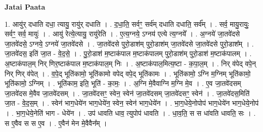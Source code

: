\documentclass[17pt]{extarticle}
\begin{document}
\textbf{Jatai Paata} \newline

1. आयु॑र् दधाति दधा॒ त्यायु॒ रायु॑र् दधाति । . द॒धा॒ति॒ सर्वꣳ॒॒ सर्व॑म् दधाति दधाति॒ सर्व᳚म् । . सर्व॒ मायु॒रायुः॒ सर्वꣳ॒॒ सर्व॒ मायुः॑ । . आयु॑ रेत्ये॒त्यायु॒ रायु॑रेति । . ए॒त्य॒ग्नये॒ ऽग्नय॑ एत्ये त्य॒ग्नये᳚ । . अ॒ग्नये॑ जा॒तवे॑दसे जा॒तवे॑दसे॒ ऽग्नये॒ ऽग्नये॑ जा॒तवे॑दसे । . जा॒तवे॑दसे पुरो॒डाश॑म् पुरो॒डाश॑म् जा॒तवे॑दसे जा॒तवे॑दसे पुरो॒डाश᳚म् । . जा॒तवे॑दस॒ इति॑ जा॒त - वे॒द॒से॒ । . पु॒रो॒डाश॑ म॒ष्टाक॑पाल म॒ष्टाक॑पालम् पुरो॒डाश॑म् पुरो॒डाश॑ म॒ष्टाक॑पालम् । . अ॒ष्टाक॑पाल॒म् निर् णिर॒ष्टाक॑पाल म॒ष्टाक॑पाल॒म् निः । . अ॒ष्टाक॑पाल॒मित्य॒ष्टा - क॒पा॒ल॒म् । . निर् व॑पेद् वपे॒न् निर् णिर् व॑पेत् । . व॒पे॒द् भूति॑कामो॒ भूति॑कामो वपेद् वपे॒द् भूति॑कामः । . भूति॑कामो॒ ऽग्नि म॒ग्निम् भूति॑कामो॒ भूति॑कामो॒ ऽग्निम् । . भूति॑काम॒ इति॒ भूति॑ - का॒मः॒ । . अ॒ग्नि मे॒वैवाग्नि म॒ग्नि मे॒व । . ए॒व जा॒तवे॑दसम् जा॒तवे॑दस मे॒वैव जा॒तवे॑दसम् । . जा॒तवे॑दसꣳ॒॒ स्वेन॒ स्वेन॑ जा॒तवे॑दसम् जा॒तवे॑दसꣳ॒॒ स्वेन॑ । . जा॒तवे॑दस॒मिति॑ जा॒त - वे॒द॒स॒म् । . स्वेन॑ भाग॒धेये॑न भाग॒धेये॑न॒ स्वेन॒ स्वेन॑ भाग॒धेये॑न । . भा॒ग॒धेये॒नोपोप॑ भाग॒धेये॑न भाग॒धेये॒नोप॑ । . भा॒ग॒धेये॒नेति॑ भाग - धेये॑न । . उप॑ धावति धाव॒ त्युपोप॑ धावति । . धा॒व॒ति॒ स स धा॑वति धावति॒ सः । . स ए॒वैव स स ए॒व । . ए॒वैन॑ मेन मे॒वैवैन᳚म् । \newline
\end{document}
